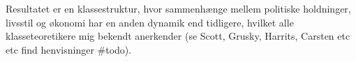 
Resultatet er en klassestruktur, hvor sammenhænge mellem politiske holdninger, livsstil og økonomi har en anden dynamik end tidligere, hvilket alle klasseteoretikere mig bekendt anerkender (se Scott, Grusky, Harrits, Carsten etc etc find henvisninger \#todo). 







